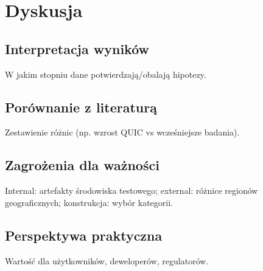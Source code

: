 \chapter{Dyskusja}

\section{Interpretacja wyników}
W jakim stopniu dane potwierdzają/obalają hipotezy.

\section{Porównanie z literaturą}
Zestawienie różnic (np. wzrost QUIC vs wcześniejsze badania).

\section{Zagrożenia dla ważności}
Internal: artefakty środowiska testowego; external: różnice regionów geograficznych; konstrukcja: wybór kategorii.

\section{Perspektywa praktyczna}
Wartość dla użytkowników, deweloperów, regulatorów.